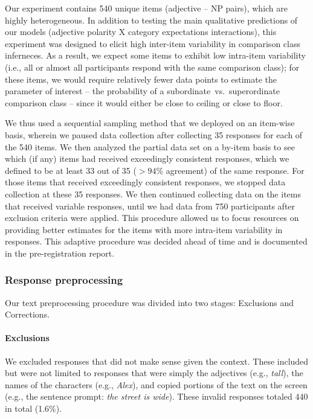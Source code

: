 \documentclass[doc]{apa6}
\begin{document}
Our experiment contains 540 unique items (adjective -- NP pairs), which are highly heterogeneous.
In addition to testing the main qualitative predictions of our models (adjective polarity X category expectations interactions), this experiment was designed to elicit high inter-item variability in comparison class inferneces.
As a result, we expect some items to exhibit low intra-item variability  (i.e., all or almost all participants respond with the same comparison class); for these items, we would require relatively fewer data points to estimate the parameter of interest -- the probability of a subordinate~vs.~superordinate comparison class -- since it would either be close to ceiling or close to floor. 

We thus used a sequential sampling method that we deployed on an item-wise basis, wherein we paused data collection after collecting 35 responses for each of the 540 items.
We then analyzed the partial data set on a by-item basis to see which (if any) items had received exceedingly consistent responses, which we defined to be at least 33 out of 35  ($>94\%$ agreement) of the same response. 
For those items that received exceedingly consistent responses, we stopped data collection at these 35 responses. 
We then continued collecting data on the items that received variable responses, until we had data from 750 participants after exclusion criteria were applied.
This procedure allowed us to focus resources on providing better estimates for the items with more intra-item variability in responses. 
This adaptive procedure was decided ahead of time and is documented in the pre-registration report. 

\subsubsection{Response preprocessing}

Our text preprocessing procedure was divided into two stages: Exclusions and Corrections. 

\paragraph{Exclusions}

We excluded responses that did not make sense given the context.
These included but were not limited to responses that were simply the adjectives (e.g., \emph{tall}), the names of the characters (e.g., \emph{Alex}), and copied portions of the text on the screen (e.g., the sentence prompt: \emph{the street is wide}). These invalid responses totaled 440 in total (1.6\%). 
\end{document}
